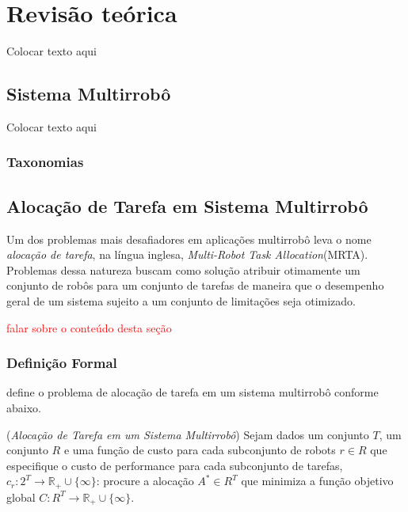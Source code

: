 \chapter[Revisão teórica]{Revisão teórica} \label{cap:revisao}
    Colocar texto aqui 
    
    \section{Sistema Multirrobô} \label{sec:mrs}
        Colocar texto aqui
    
        \subsection{Taxonomias} \label{subsec:taxonomias_mrs}
    
    \section{Alocação de Tarefa em Sistema Multirrobô} \label{sec:mrta}
        Um dos problemas mais desafiadores em aplicações multirrobô leva o nome \textit{alocação de tarefa}, na língua inglesa, \textit{Multi-Robot Task Allocation}(MRTA). Problemas dessa natureza buscam como solução atribuir otimamente um conjunto de robôs para um conjunto de tarefas de maneira que o desempenho geral de um sistema sujeito a um conjunto de limitações seja otimizado.
        
        \textcolor{red}{falar sobre o conteúdo desta seção}
        
        
        \subsection{Definição Formal} \label{subsec:mrta_formal}
             define o problema de alocação de tarefa em um sistema multirrobô conforme abaixo.
            
            \begin{definicao} \label{def:mrta}
                (\textit{Alocação de Tarefa em um Sistema Multirrobô})
                Sejam dados um conjunto $T$, um conjunto $R$ e uma função de custo para cada subconjunto de robots $r \in R$ que especifique o custo de performance para cada subconjunto de tarefas, $c_r : 2^T \to \mathbb{R}_+\cup\{\infty\}$: procure a alocação $A^* \in R^T$ que minimiza a função objetivo global $C : R^T \to \mathbb{R}_+\cup\{\infty\}$.
            \end{definicao}
        
